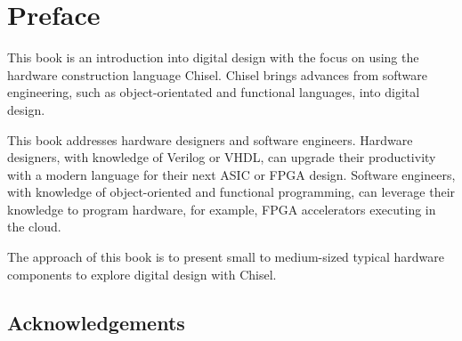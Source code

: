 \documentclass[%
    10pt,
    headinclude, footexclude,
    openright, %
    notitlepage,
    cleardoubleempty,
    headsepline,
    pointlessnumbers,
    bibtotoc, idxtotoc,
    ]{scrbook}
\begin{document}
\frontmatter

\hypertarget{contents}{}
\tableofcontents


\begingroup
\let\cleardoublepage\clearpage
\listoffigures
\listoftables
\lstlistoflistings
\endgroup

%
%
%

\chapter{Preface}

This book is an introduction into digital design with the focus on using the hardware construction language Chisel. Chisel brings advances from software engineering, such as object-orientated and functional languages, into digital design.

This book addresses hardware designers and software engineers. Hardware designers, with knowledge of Verilog or VHDL, can upgrade their productivity with a modern language for their next ASIC or FPGA design. Software engineers, with knowledge of object-oriented and functional programming, can leverage their knowledge to program hardware, for example, FPGA accelerators executing in the cloud.

The approach of this book is to present small to medium-sized typical hardware components to explore digital design with Chisel.




\section*{Acknowledgements}
\end{document}
